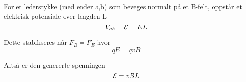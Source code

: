 For et lederstykke (med ender a,b) som beveges normalt på et B-felt,
oppstår et elektrisk potensiale over lengden L
$$V_{ab} = \mathcal{E} = EL$$

Dette stabiliseres når $F_B = F_E$ hvor
$$qE = qvB$$

Altså er den genererte spenningen
$$\mathcal{E} = vBL$$
